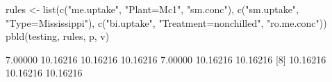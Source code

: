 \begin{Schunk}
% --begin: "pbld_custom"
\begin{Sinput}
 rules <- list(c("me.uptake", "Plant=Mc1", "sm.conc"),
               c("sm.uptake", "Type=Mississippi"),
               c("bi.uptake", "Treatment=nonchilled", "ro.me.conc"))
 pbld(testing, rules, p, v)
\end{Sinput}
\begin{Soutput}
 [1]  7.00000 10.16216 10.16216 10.16216  7.00000 10.16216 10.16216
 [8] 10.16216 10.16216 10.16216
\end{Soutput}
%
% --end: "pbld_custom"
\end{Schunk}

